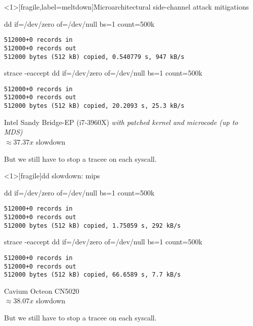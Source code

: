 \documentclass[unicode]{beamer}
\begin{document}

\begin{frame}<1>[fragile,label=meltdown]{Microarchitectural side-channel attack mitigations}
\begin{block}{\large dd if=/dev/zero of=/dev/null bs=1 count=500k}
\begin{verbatim}
512000+0 records in
512000+0 records out
512000 bytes (512 kB) copied, 0.540779 s, 947 kB/s
\end{verbatim}
\end{block}
\begin{block}{\large strace -eaccept dd if=/dev/zero of=/dev/null bs=1 count=500k}
\begin{verbatim}
512000+0 records in
512000+0 records out
512000 bytes (512 kB) copied, 20.2093 s, 25.3 kB/s
\end{verbatim}
\end{block}
\begin{scriptsize}
Intel Sandy Bridge-EP (i7-3960X) \emph{with patched kernel and microcode (up to MDS)} \\
$\approx 37.37x$ slowdown \\
\end{scriptsize}
\pause
But we still have to stop a tracee on each syscall.
\end{frame}

\begin{frame}<1>[fragile]{dd slowdown: mips}
\begin{block}{\large dd if=/dev/zero of=/dev/null bs=1 count=500k}
\begin{verbatim}
512000+0 records in
512000+0 records out
512000 bytes (512 kB) copied, 1.75059 s, 292 kB/s
\end{verbatim}
\end{block}
\begin{block}{\large strace -eaccept dd if=/dev/zero of=/dev/null bs=1 count=500k}
\begin{verbatim}
512000+0 records in
512000+0 records out
512000 bytes (512 kB) copied, 66.6589 s, 7.7 kB/s
\end{verbatim}
\end{block}
\begin{scriptsize}
Cavium Octeon CN5020 \\
$\approx 38.07x$ slowdown \\
\end{scriptsize}
\pause
But we still have to stop a tracee on each syscall.
\end{frame}
\end{document}
